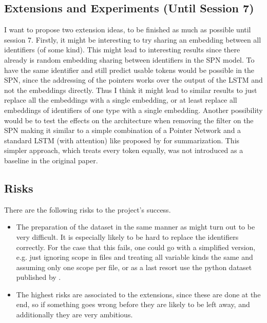 \documentclass[11pt]{article}
\begin{document}
\subsection{Extensions and Experiments (Until Session 7)}
I want to propose two extension ideas, to be finished as much as possible until session 7.
Firstly, it might be interesting to try sharing an embedding between all identifiers (of some kind). This might lead to interesting results since there already is random embedding sharing between identifiers in the SPN model. To have the same identifier and still predict usable tokens would be possible in the SPN, since the addressing of the pointers works over the output of the LSTM and not the embeddings directly. Thus I think it might lead to similar results to just replace all the embeddings with a single embedding, or at least replace all embeddings of identifiers of one type with a single embedding.
Another possibility would be to test the effects on the architecture when removing the filter on the SPN making it similar to a simple combination of a Pointer Network \citep{NIPS2015_5866} and a standard LSTM (with attention) like proposed by \cite{See_2017} for summarization. This simpler approach, which treats every token equally, was not introduced as a baseline in the original paper.

\subsection{Risks}
There are the following risks to the project's success.
\begin{itemize}
	\item The preparation of the dataset in the same manner as \cite{bhoopchand2016learning} might turn out to be very difficult. It is especially likely to be hard to replace the identifiers correctly. For the case that this fails, one could go with a simplified version, e.g. just ignoring scope in files and treating all variable kinds the same and assuming only one scope per file, or as a last resort use the python dataset published by \cite{bhoopchand2016learning}.
	\item The highest risks are associated to the extensions, since these are done at the end, so if something goes wrong before they are likely to be left away, and additionally they are very ambitious.
\end{itemize}

{}

\newpage
\appendix
\end{document}
